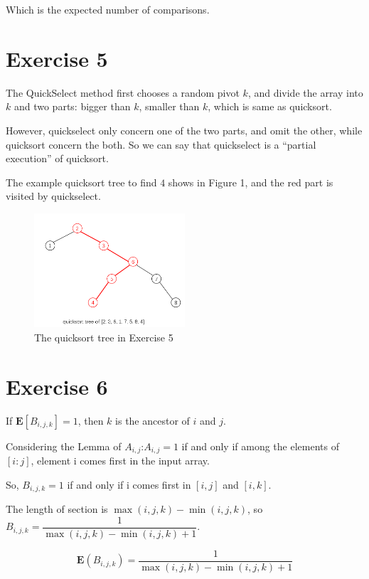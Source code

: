 \documentclass[
]{article}
\begin{document}
Which is the expected number of comparisons.

\hypertarget{exercise-5}{%
\section{Exercise 5}\label{exercise-5}}

The QuickSelect method first chooses a random pivot \(k\), and divide
the array into \(k\) and two parts: bigger than \(k\), smaller than
\(k\), which is same as quicksort.

However, quickselect only concern one of the two parts, and omit the
other, while quicksort concern the both. So we can say that quickselect
is a ``partial execution'' of quicksort.

The example quicksort tree to find \(4\) shows in Figure 1, and the red
part is visited by quickselect.

\begin{figure}
\centering
\includegraphics[width=0.5\textwidth,height=\textheight]{1.png}
\caption{The quicksort tree in Exercise 5}
\end{figure}

\hypertarget{exercise-6}{%
\section{Exercise 6}\label{exercise-6}}

If \(\mathbf{E}[B_{i,j,k}]=1\), then \(k\) is the ancestor of \(i\) and
\(j\).

Considering the Lemma of \(A_{i,j}\):\(A_{i,j}=1\) if and only if among
the elements of \([i:j]\), element i comes first in the input array.

So, \(B_{i,j,k}=1\) if and only if i comes first in \([i,j]\) and
\([i,k]\).

The length of section is \(\max(i,j,k)-\min(i,j,k)\), so
\(B_{i,j,k}=\dfrac{1}{\max(i,j,k)-\min(i,j,k)+1}\).

\[\mathbf E(B_{i,j,k})=\frac{1}{\max(i,j,k)-\min(i,j,k)+1}\]
\end{document}
